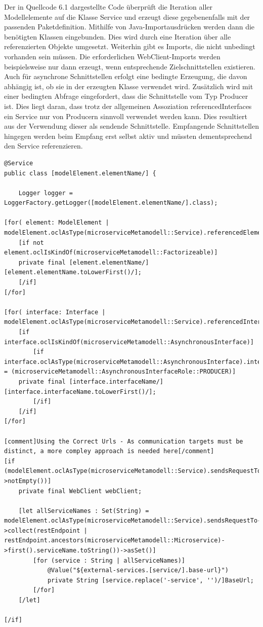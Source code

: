 Der in Quellcode 6.1 dargestellte Code überprüft die Iteration aller Modellelemente auf die Klasse Service und erzeugt diese gegebenenfalls mit der passenden Paketdefinition. Mithilfe von Java-Importausdrücken werden dann die benötigten Klassen eingebunden. Dies wird durch eine Iteration über alle referenzierten Objekte umgesetzt. Weiterhin gibt es Imports, die nicht unbedingt vorhanden sein müssen. Die erforderlichen WebClient-Imports werden beispielsweise nur dann erzeugt, wenn entsprechende Zielschnittstellen existieren. Auch für asynchrone Schnittstellen erfolgt eine bedingte Erzeugung, die davon abhängig ist, ob sie in der erzeugten Klasse verwendet wird. Zusätzlich wird mit einer bedingten Abfrage eingefordert, dass die Schnittstelle vom Typ Producer ist.
\newpage
Dies liegt daran, dass trotz der allgemeinen Assoziation \glqq referencedInterfaces\grqq{} ein Service nur von Producern sinnvoll verwendet werden kann. Dies resultiert aus der Verwendung dieser als sendende Schnittstelle. Empfangende Schnittstellen hingegen werden beim Empfang erst selbst aktiv und müssten dementsprechend den Service referenzieren.

\begin{lstlisting}[caption=Klassenattribute]
@Service
public class [modelElement.elementName/] {

    Logger logger = LoggerFactory.getLogger([modelElement.elementName/].class);

[for( element: ModelElement | modelElement.oclAsType(microserviceMetamodell::Service).referencedElements)]
	[if not element.oclIsKindOf(microserviceMetamodell::Factorizeable)]
	private final [element.elementName/] [element.elementName.toLowerFirst()/];
	[/if]
[/for]

[for( interface: Interface | modelElement.oclAsType(microserviceMetamodell::Service).referencedInterfaces)]
	[if interface.oclIsKindOf(microserviceMetamodell::AsynchronousInterface)]
		[if interface.oclAsType(microserviceMetamodell::AsynchronousInterface).interfaceRole = (microserviceMetamodell::AsynchronousInterfaceRole::PRODUCER)]
	private final [interface.interfaceName/] [interface.interfaceName.toLowerFirst()/];
		[/if]
	[/if]
[/for]

[comment]Using the Correct Urls - As communication targets must be distinct, a more compley approach is needed here[/comment]
[if (modelElement.oclAsType(microserviceMetamodell::Service).sendsRequestTo->notEmpty())]
    private final WebClient webClient;

    [let allServiceNames : Set(String) = modelElement.oclAsType(microserviceMetamodell::Service).sendsRequestTo->collect(restEndpoint | restEndpoint.ancestors(microserviceMetamodell::Microservice)->first().serviceName.toString())->asSet()]
        [for (service : String | allServiceNames)]
            @Value("${external-services.[service/].base-url}")
            private String [service.replace('-service', '')/]BaseUrl;
        [/for]
    [/let]

[/if]
\end{lstlisting}

